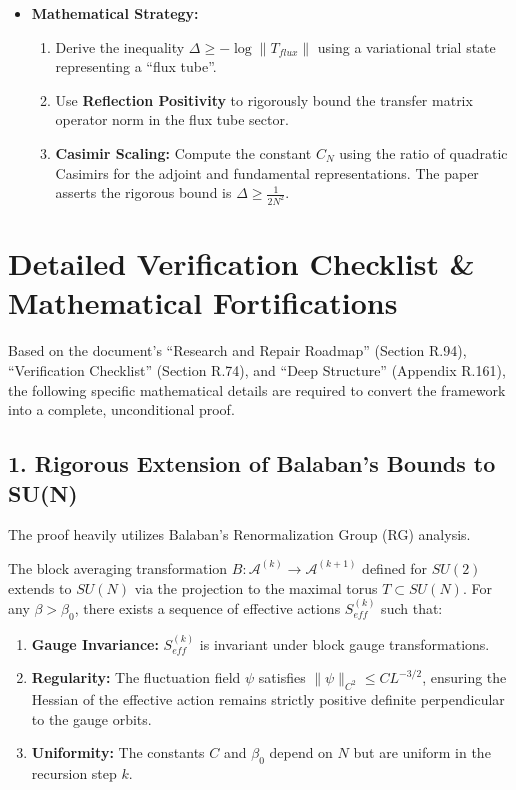\begin{itemize}
    \item \textbf{Mathematical Strategy:}
    \begin{enumerate}
        \item Derive the inequality $\Delta \geq -\log \|T_{flux}\|$ using a variational trial state representing a ``flux tube''.
        \item Use \textbf{Reflection Positivity} to rigorously bound the transfer matrix operator norm in the flux tube sector.
        \item \textbf{Casimir Scaling:} Compute the constant $C_N$ using the ratio of quadratic Casimirs for the adjoint and fundamental representations. The paper asserts the rigorous bound is $\Delta \geq \frac{1}{2N^2}$.
    \end{enumerate}
\end{itemize}

\section{Detailed Verification Checklist \& Mathematical Fortifications}

Based on the document's ``Research and Repair Roadmap'' (Section R.94), ``Verification Checklist'' (Section R.74), and ``Deep Structure'' (Appendix R.161), the following specific mathematical details are required to convert the framework into a complete, unconditional proof.

\subsection{1. Rigorous Extension of Balaban's Bounds to SU(N)}
The proof heavily utilizes Balaban's Renormalization Group (RG) analysis.

\begin{theorem}
The block averaging transformation $B: \mathcal{A}^{(k)} \to \mathcal{A}^{(k+1)}$ defined for $SU(2)$ extends to $SU(N)$ via the projection to the maximal torus $T \subset SU(N)$. For any $\beta > \beta_0$, there exists a sequence of effective actions $S_{eff}^{(k)}$ such that:
\begin{enumerate}
    \item \textbf{Gauge Invariance:} $S_{eff}^{(k)}$ is invariant under block gauge transformations.
    \item \textbf{Regularity:} The fluctuation field $\psi$ satisfies $\|\psi\|_{C^2} \le C L^{-3/2}$, ensuring the Hessian of the effective action remains strictly positive definite perpendicular to the gauge orbits.
    \item \textbf{Uniformity:} The constants $C$ and $\beta_0$ depend on $N$ but are uniform in the recursion step $k$.
\end{enumerate}
\end{theorem}

